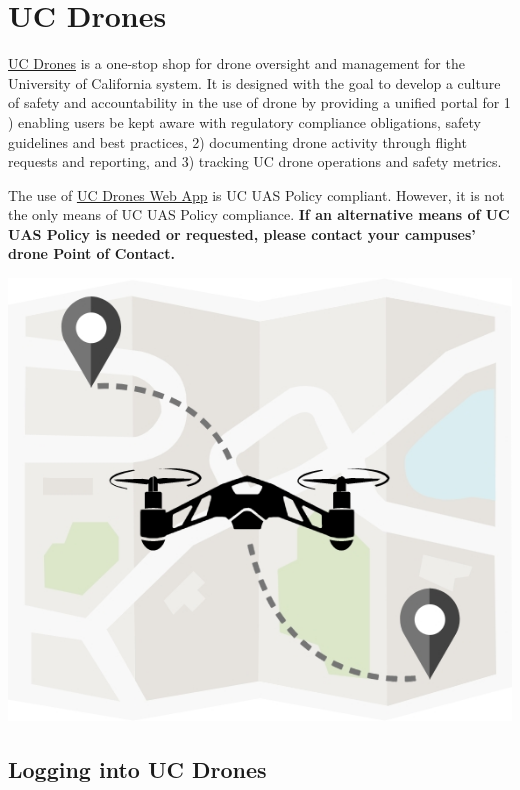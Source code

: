 \documentclass[
  12pt,
]{book}
\begin{document}
\hypertarget{UCdrones}{%
\chapter{UC Drones}\label{UCdrones}}

\href{http://ehs.ucop.edu/drones}{UC Drones} is a one-stop shop for drone oversight and management for the University of California system. It is designed with the goal to develop a culture of safety and accountability in the use of drone by providing a unified portal for 1 ) enabling users be kept aware with regulatory compliance obligations, safety guidelines and best practices, 2) documenting drone activity through flight requests and reporting, and 3) tracking UC drone operations and safety metrics.

The use of \href{http://ehs.ucop.edu/drones}{UC Drones Web App} is UC UAS Policy compliant. However, it is not the only means of UC UAS Policy compliance. \textbf{If an alternative means of UC UAS Policy is needed or requested, please contact your campuses' drone Point of Contact.}

\href{http://ehs.ucop.edu/drones}{\includegraphics{images/UCDrones_logo.jpg}}

\hypertarget{UCdrones-login}{%
\section{Logging into UC Drones}\label{UCdrones-login}}
\end{document}
